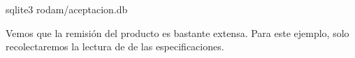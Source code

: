 \documentclass[letterpaper,10pt,spanish]{sphinxmanual}
\begin{document}
\begin{sphinxVerbatim}[commandchars=\\\{\}]

sqlite3 rodam/aceptacion.db 
\end{sphinxVerbatim}

\begin{sphinxVerbatim}[commandchars=\\\{\}]
\end{sphinxVerbatim}

Vemos que la remisión del producto es bastante extensa. Para este
ejemplo, solo recolectaremos la lectura de  de las
especificaciones.
\end{document}
